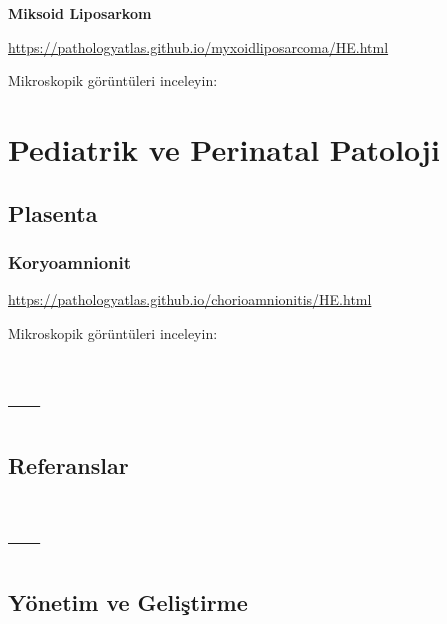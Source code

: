 \documentclass[
  letterpaper,
  DIV=11,
  numbers=noendperiod]{scrreprt}
\newlength{\cslhangindent}
\newlength{\cslentryspacingunit} %
\newenvironment{CSLReferences}[2] %
 {%
  \setlength{\parindent}{0pt}
  \ifodd #1
  \let\oldpar\par
  \def\par{\hangindent=\cslhangindent\oldpar}
  \fi
  \setlength{\parskip}{#2\cslentryspacingunit}
 }%
 {}
\begin{document}
\textbf{Miksoid Liposarkom}

\url{https://pathologyatlas.github.io/myxoidliposarcoma/HE.html}

Mikroskopik görüntüleri inceleyin:

\part{Pediatrik ve Perinatal Patoloji}

\hypertarget{plasenta}{%
\chapter{Plasenta}\label{plasenta}}

\hypertarget{koryoamnionit}{%
\section{Koryoamnionit}\label{koryoamnionit}}

\url{https://pathologyatlas.github.io/chorioamnionitis/HE.html}

Mikroskopik görüntüleri inceleyin:

\part{---}


\hypertarget{referanslar}{%
\chapter*{Referanslar}\label{referanslar}}

\hypertarget{refs}{}
\begin{CSLReferences}{0}{0}
\end{CSLReferences}

\part{---}

\appendix
{}

\hypertarget{yuxf6netim-ve-geliux15ftirme}{%
\chapter{Yönetim ve Geliştirme}\label{yuxf6netim-ve-geliux15ftirme}}
\end{document}
